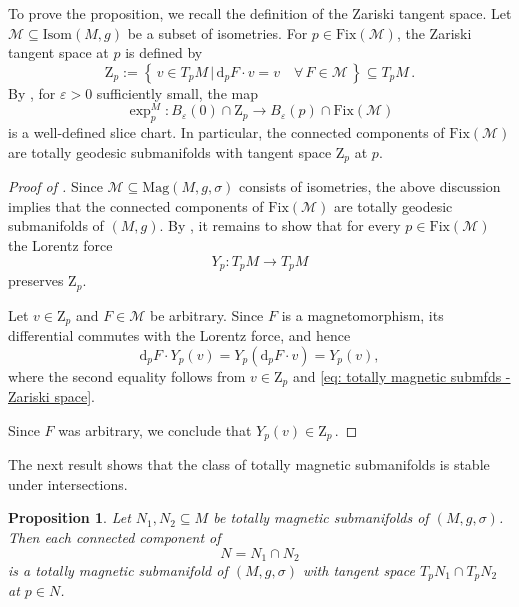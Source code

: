 \documentclass[11pt,reqno]{amsart}
\theoremstyle{plain}
\newtheorem{prop}[thm]{Proposition}
\theoremstyle{definition}
\numberwithin{equation}{section}
\def\d{\delta}
\def\d{\delta}
\def\d{{\mathrm{d}}}
\newcommand{\set}[2]{\left\{ \, #1  \, | \,  #2 \, \right\}}
\begin{document}
To prove the proposition, we recall the definition of the Zariski tangent space. Let $\mathcal{M} \subseteq \mathrm{Isom}(M,g)$ be a subset of isometries. For $p \in \mathrm{Fix}(\mathcal{M})$, the Zariski tangent space at $p$ is defined by
\begin{equation}
\label{eq: totally magnetic submfds - Zariski space}
\mathrm{Z}_p := \set{v \in T_p M}{ \d_p F \cdot v = v \quad \forall \, F \in \mathcal{M}} \subseteq T_p M \, .
\end{equation}
By \cite[Prop.~5.6.5]{Pet}, for $\varepsilon > 0$ sufficiently small, the map
\[
\exp_p^M : B_\varepsilon(0) \cap \mathrm{Z}_p \longrightarrow B_\varepsilon(p) \cap \mathrm{Fix}(\mathcal{M})
\]
is a well-defined slice chart. In particular, the connected components of $\mathrm{Fix}(\mathcal{M})$ are totally geodesic submanifolds with tangent space $\mathrm{Z}_p$ at $p$.

\begin{proof}[Proof of ]
Since $\mathcal{M} \subseteq \mathrm{Mag}(M,g,\sigma)$ consists of isometries, the above discussion implies that the connected components of $\mathrm{Fix}(\mathcal{M})$ are totally geodesic submanifolds of $(M,g)$. By , it remains to show that for every $p \in \mathrm{Fix}(\mathcal{M})$ the Lorentz force
\[
Y_p : T_p M \longrightarrow T_p M
\]
preserves $\mathrm{Z}_p$.

Let $v \in \mathrm{Z}_p$ and $F \in \mathcal{M}$ be arbitrary. Since $F$ is a magnetomorphism, its differential commutes with the Lorentz force, and hence
\[
\d_p F \cdot Y_p(v) = Y_p(\d_p F \cdot v) = Y_p(v),
\]
where the second equality follows from $v \in \mathrm{Z}_p$ and \eqref{eq: totally magnetic submfds - Zariski space}. 

Since $F$ was arbitrary, we conclude that $Y_p(v) \in \mathrm{Z}_p \,$.
\end{proof}
The next result shows that the class of totally magnetic submanifolds is stable under intersections.
\begin{prop}
\label{prop: totally magnetic submfds - intersections}
Let $N_1, N_2 \subseteq M$ be totally magnetic submanifolds of $(M,g,\sigma)$. Then each connected component of $$N = N_1 \cap N_2$$ is a totally magnetic submanifold of $(M,g,\sigma)$ with tangent space $T_p N_1 \cap T_p N_2$ at $p \in N$.
\end{prop}
\end{document}
